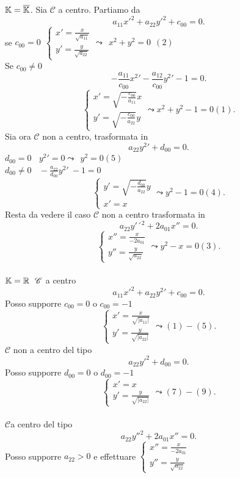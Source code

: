 \documentclass[12px]{article}
\begin{document}
\begin{dimo}
		$\mathbb{K} = \overline {\mathbb{K}}$. Sia  $\mathscr{C}$ a centro. Partiamo da 
		\[
		 a_{11}x'^2 + a_{22}y'^2 + c_{00} =0
		.\] 
		se $c_{00} = 0 \ \ \begin{cases}
			x' = \frac {x} {\sqrt {a_{11}}}\\
			y'  = \frac y {\sqrt{a_{22}}}
		\end{cases} \leadsto \ \ x^2 + y^2 = 0 \ \ (2)$ \\
		Se $c_{00} \neq 0$
		\[
			-\frac {a_{11}}{c_{00}}x^2 ' - \frac{a_{12}}{c_{00}}y^2 ' - 1 = 0
		.\] 
		\[
		 \begin{cases}
			 x' = \sqrt{-\frac {c_{00}}{a_{11}}}x\\
			 y'= \sqrt{-\frac{c_{00}}{a_{22}}}y
		 \end{cases} \leadsto x^2 + y^2 -1 = 0(1)
		.\] 
		Sia ora $\mathscr{C}$ non a centro, trasformata in 
		\[
		 a_{22} y^2 ' + d_{00} = 0
		.\] 
		$d_{00} =0  \ \ \ \ y^2 ' =0 \leadsto \ \ y^2 =0 (5)$\\
	$d_{00}\neq 0 \ \ \ \ -\frac {a_{22}}{d_{00}}y^2' \ - 1 =0 $
	\[
	 \begin{cases}
		 y'= \sqrt{-\frac{d_{00}}{a_{22}}}y\\
		 x' = x
	 \end{cases} \leadsto y^2 - 1 = 0 (4)
	.\]
	Resta da vedere il caso $\mathscr{C} $ non a centro trasformata in 
	\[
	 a_{22} y'´ ^2 + 2a_{01}x''= 0
	.\] 
	\[
	 \begin{cases}
		 x''= \frac x {-2a_{01}}\\
		 y'' = \frac y {\sqrt{a_{22}}}
	 \end{cases}\leadsto y^2-x = 0 (3)
	.\] \\
	$\mathbb{K} = \mathbb{R} \ \ \mathscr{C} $  a centro\\
	\[
	 a_{11} x'^2 + a_{22}y^2 ' + c_{00} =0 
	.\] 
	Posso supporre $c_00 =0 $ o $c_00 = -1$\\
	\[
	 \begin{cases}
		 x'= \frac x {\sqrt{|a_{11}|}}\\
		 y' = \frac y {\sqrt{|a_{22}|}}
	 \end{cases}\leadsto (1)-(5)
	.\] 
	$\mathscr{C}$ non a centro del tipo
	\[
	a_{22}y'^2 + d_00 = 0
	.\] 
	Posso supporre $d_{00} = 0$ o $d_{00} = -1$\\
	\[
	\begin{cases}
		x' = x\\
		y' = \frac y {\sqrt{|a_{22}|}}
	\end{cases} \leadsto (7) - (9)
	.\] \\
	$\mathscr{C} $a centro del tipo 
	\[
		a_{22} y''^2 + 2a_{01}x'' = 0
	.\] 
	Posso supporre $a_{22} >0$ e effettuare $ \begin{cases}
		x'' = \frac x {-2 a_{01}}\\
		y'' = \frac y {\sqrt{a_{22}}}
	\end{cases}$ 
	\end{dimo}
\end{document}
